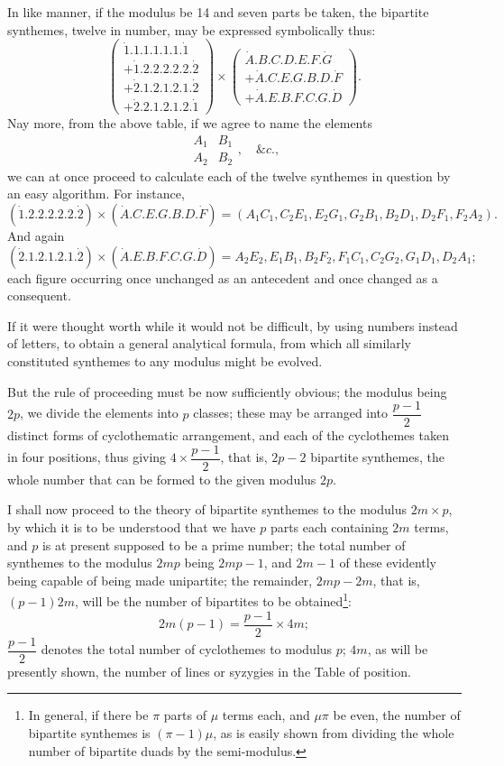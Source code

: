 \documentclass[11pt]{article}
\newcommand{\sourcepage}[1]{\marginpar{\scriptsize p.~#1}}
\newcommand{\dotter}[1]{\dot{#1}}
\begin{document}
{{In like manner, if the modulus be 14 and seven parts be taken, the bipartite synthemes, twelve in number, may be expressed symbolically thus:
\[
\left(\begin{array}{l}
\dotter1.1.1.1.1.1.\dotter1\\
+\dotter1.2.2.2.2.2.\dotter2\\
+\dotter2.1.2.1.2.1.\dotter2\\
+\dotter2.2.1.2.1.2.\dotter1
\end{array}\right)
\times
\left(\begin{array}{l}
\dotter A.B.C.D.E.F.\dotter G\\
+\dotter A.C.E.G.B.D.\dotter F\\
+\dotter A.E.B.F.C.G.\dotter D
\end{array}\right).
\]
Nay more, from the above table, if we agree to name the elements
\[
\begin{array}{cc}
A_1&B_1\\ A_2&B_2
\end{array},\quad \&c.,
\]
we can at once proceed to calculate each of the twelve synthemes in question by an easy algorithm. For instance,
\[
(\dotter1.2.2.2.2.2.\dotter2)\times(\dotter A.C.E.G.B.D.\dotter F)
=(A_1C_1,C_2E_1,E_2G_1,G_2B_1,B_2D_1,D_2F_1,F_2A_2).
\]
And again
\[
(\dotter2.1.2.1.2.1.\dotter2)\times(\dotter A.E.B.F.C.G.\dotter D)
= A_2E_2,E_1B_1,B_2F_2,F_1C_1,C_2G_2,G_1D_1,D_2A_1;
\]
each figure occurring once unchanged as an antecedent and once changed as a consequent.

If it were thought worth while it would not be difficult, by using numbers instead of letters, to obtain a general analytical formula, from which all similarly constituted synthemes to any modulus might be evolved.

But the rule of proceeding must be now sufficiently obvious; the modulus being $2p$, we divide the elements into $p$ classes; these may be arranged into $\dfrac{p-1}{2}$ distinct forms of cyclothematic arrangement, and each of the cyclothemes taken in four positions, thus giving $4\times\dfrac{p-1}{2}$, that is, $2p-2$ bipartite synthemes, the whole number that can be formed to the given modulus $2p$.

\sourcepage{97}
I shall now proceed to the theory of bipartite synthemes to the modulus $2m\times p$, by which it is to be understood that we have $p$ parts each containing $2m$ terms, and $p$ is at present supposed to be a prime number; the total number of synthemes to the modulus $2mp$ being $2mp-1$, and $2m-1$ of these evidently being capable of being made unipartite; the remainder, $2mp-2m$, that is, $(p-1)2m$, will be the number of bipartites to be obtained\footnote{In general, if there be $\pi$ parts of $\mu$ terms each, and $\mu\pi$ be even, the number of bipartite synthemes is $(\pi-1)\mu$, as is easily shown from dividing the whole number of bipartite duads by the semi-modulus.}:
\[
2m(p-1)=\frac{p-1}{2}\times 4m;
\]
$\dfrac{p-1}{2}$ denotes the total number of cyclothemes to modulus $p$; $4m$, as will be presently shown, the number of lines or syzygies in the Table of position.

}}
\end{document}
